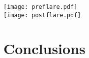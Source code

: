 \clearpage
\begin{figure*}[htb!]\centering
    \texttt{[image: preflare.pdf]}\\
    \texttt{[image: postflare.pdf]}
\end{figure*}




\clearpage
\section{Conclusions}

